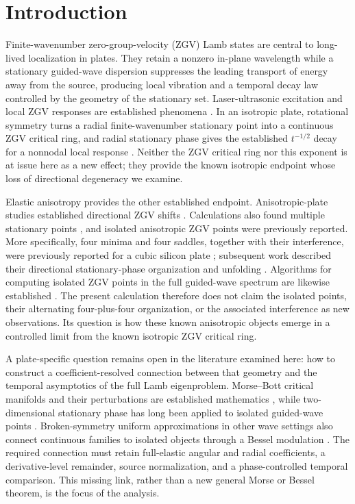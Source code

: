 \section{Introduction}

Finite-wavenumber zero-group-velocity (ZGV) Lamb states are central to
long-lived localization in plates.  They retain a nonzero in-plane wavelength
while a stationary guided-wave dispersion suppresses the
leading transport of energy away from the source, producing local vibration
and a temporal decay law controlled by the geometry of the stationary set.
Laser-ultrasonic excitation and local ZGV responses are established
phenomena \citep{prada2005laser,prada2008local}.  In an isotropic plate,
rotational symmetry turns a radial finite-wavenumber stationary point into a
continuous ZGV critical ring, and radial stationary phase gives the established
\(t^{-1/2}\) decay for a nonnodal local response
\citep{prada2008power,laurent2014temporal}.  Neither the ZGV critical ring nor
this exponent is at issue here as a new effect; they provide the known
isotropic endpoint whose loss of directional degeneracy we examine.

Elastic anisotropy provides the other established endpoint.  Anisotropic-plate
studies established directional ZGV shifts \citep{prada2009anisotropy}.
Calculations also found multiple stationary points
\citep{hussain2012multiple,karous2019multiple}, and isolated anisotropic ZGV
points were previously reported.  More specifically, four minima and four saddles, together with
their interference, were previously reported for a cubic silicon plate
\citep{kiefer2023beating}; subsequent work described their directional
stationary-phase organization and unfolding \citep{kiefer2025skewing}.
Algorithms for computing isolated ZGV points in the full guided-wave spectrum
are likewise established \citep{kiefer2023computing,plestenjak2025sylvester}.
The present calculation therefore does not claim the isolated points, their
alternating four-plus-four organization, or the associated interference as
new observations.  Its question is how these known anisotropic objects emerge
in a controlled limit from the known isotropic ZGV critical ring.

A plate-specific question remains open in the literature examined here: how to
construct a coefficient-resolved connection between that geometry and the
temporal asymptotics of the full Lamb eigenproblem.
Morse--Bott critical manifolds and their perturbations are established
mathematics \citep{bott1954critical,banyaga2013cascades}, while
two-dimensional stationary phase has long been applied to isolated guided-wave
points \citep{velichko2007excitation,chapuis2010focusing,
karmazin2013caustics}.  Broken-symmetry uniform approximations in other wave
settings also connect continuous families to isolated objects through a
Bessel modulation \citep{creagh1996broken,brack1999uniform,brack2009closed}.
The required connection must retain full-elastic angular and radial
coefficients, a derivative-level remainder, source normalization, and a
phase-controlled temporal comparison.  This missing link, rather than a new
general Morse or Bessel theorem, is the focus of the analysis.

